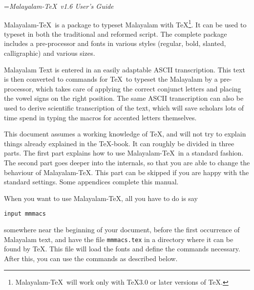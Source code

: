 
\def\editdate{4 May 1998}




\parindent=0pt
\def\@{@}

\def\today{\number\day\space\ifcase\month\or January\or February\or March\or April\or May\or
    June\or July\or August\or September\or October\or November\or December\fi
    \space\number\year}

\def\MT{Malayalam-\TeX}

\headline={{\hfil \it \MT\ v1.6 User's Guide}}



\MT\ is a package to typeset Malayalam with
\TeX\footnote*{\MT\ will work only with \TeX3.0 or later
versions of \TeX.}. It can be used to typeset in both
the traditional and reformed script. The complete package
includes a pre-processor and fonts in various styles (regular, bold,
slanted, calligraphic) and various sizes.

Malayalam Text
is entered in an easily adaptable ASCII transcription.
This text is then converted to commands for \TeX\ to typeset
the Malayalam by a pre-processor, which takes care of applying the
correct conjunct letters and placing the vowel signs on the right position.
The same ASCII transcription can also be used to derive scientific
transcription of the text, which will save scholars lots of time
spend in typing the macros for accented letters themselves.

This document assumes a working knowledge of \TeX, and will not
try to explain things already explained in the \TeX-book. It
can roughly be divided in three parts. The first part explains how to
use \MT\ in a standard fashion. The second part goes deeper
into the internals, so that you are able to change the behaviour of
\MT. This part can be skipped if you are happy with the
standard settings. Some appendices complete this manual.

\vfill\eject
{}

When you want to use \MT, all you have to do is say

\medskip
{\tt\bslash input mmmacs}
\medskip

somewhere near the beginning of your document, before the first
occurrence of Malayalam text, and have the file {\tt mmmacs.tex} in
a directory where it can be found by \TeX. This file will load the
fonts and define the commands necessary. After this, you can use the
commands as described below.


